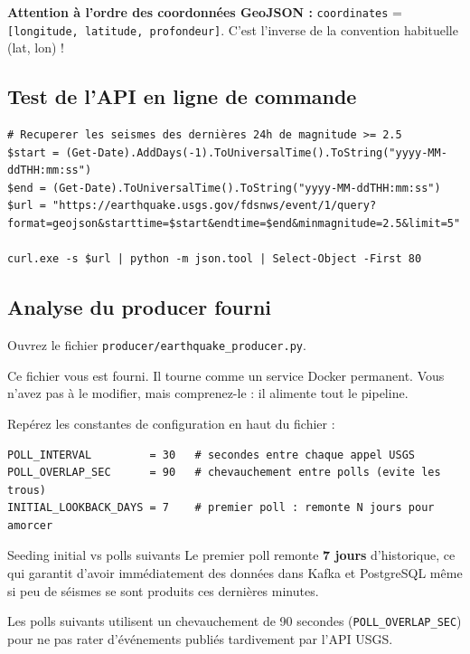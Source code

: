 \documentclass[12pt,a4paper]{article}
\begin{document}
\begin{warningbox}
  \textbf{Attention à l'ordre des coordonnées GeoJSON :}
  \texttt{coordinates} = \texttt{[longitude, latitude, profondeur]}.
  C'est l'inverse de la convention habituelle (lat, lon) !
\end{warningbox}

\subsection{Test de l'API en ligne de commande}

\begin{lstlisting}[style=bash, caption={Appel curl vers l'API USGS}]
# Recuperer les seismes des dernières 24h de magnitude >= 2.5
$start = (Get-Date).AddDays(-1).ToUniversalTime().ToString("yyyy-MM-ddTHH:mm:ss")
$end = (Get-Date).ToUniversalTime().ToString("yyyy-MM-ddTHH:mm:ss")
$url = "https://earthquake.usgs.gov/fdsnws/event/1/query?format=geojson&starttime=$start&endtime=$end&minmagnitude=2.5&limit=5"

curl.exe -s $url | python -m json.tool | Select-Object -First 80
\end{lstlisting}

\subsection{Analyse du producer fourni}

Ouvrez le fichier \texttt{producer/earthquake\_producer.py}.

\begin{fournibox}
  Ce fichier vous est fourni. Il tourne comme un service Docker permanent.
  Vous n'avez pas à le modifier, mais comprenez-le : il alimente tout le pipeline.
\end{fournibox}

Repérez les constantes de configuration en haut du fichier :

\begin{lstlisting}[style=python, caption={Constantes du producer}]
POLL_INTERVAL         = 30   # secondes entre chaque appel USGS
POLL_OVERLAP_SEC      = 90   # chevauchement entre polls (evite les trous)
INITIAL_LOOKBACK_DAYS = 7    # premier poll : remonte N jours pour amorcer
\end{lstlisting}

\begin{conceptbox}{Seeding initial vs polls suivants}
  Le premier poll remonte \textbf{7 jours} d'historique, ce qui garantit d'avoir
  immédiatement des données dans Kafka et PostgreSQL même si peu de séismes
  se sont produits ces dernières minutes.

  Les polls suivants utilisent un chevauchement de 90 secondes (\texttt{POLL\_OVERLAP\_SEC})
  pour ne pas rater d'événements publiés tardivement par l'API USGS.
\end{conceptbox}
\end{document}
